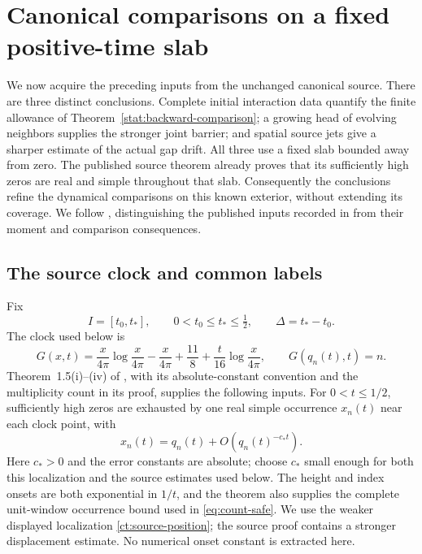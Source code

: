 \section{Canonical comparisons on a fixed positive-time slab}
\label{sec:canonicaltime}

We now acquire the preceding inputs from the unchanged canonical source.
There are three distinct conclusions. Complete initial interaction data
quantify the finite allowance of Theorem~\ref{stat:backward-comparison};
a growing head of evolving neighbors supplies the stronger joint barrier;
and spatial source jets give a sharper estimate of the actual gap drift.
All three use a fixed slab bounded away from zero. The published source
theorem already proves that its sufficiently high zeros are real and
simple throughout that slab. Consequently the conclusions refine the
dynamical comparisons on this known exterior, without extending its
coverage. We follow \cite{BakerCM21,BakerCM24,BakerCM25}, distinguishing
the published inputs recorded in \cite{BakerCMSource04} from their
moment and comparison consequences.

\subsection{The source clock and common labels}

Fix
\begin{equation}
 I=[t_0,t_*],\qquad 0<t_0\le t_*\le\tfrac12,
 \qquad \Delta=t_*-t_0.
 \label{ct:slab}
\end{equation}
The clock used below is
\begin{equation}
 G(x,t)=\frac{x}{4\pi}\log\frac{x}{4\pi}-\frac{x}{4\pi}
       +\frac{11}{8}+\frac{t}{16}\log\frac{x}{4\pi},
 \qquad G(q_n(t),t)=n.
 \label{ct:clock}
\end{equation}
Theorem~1.5(i)--(iv) of \cite{Polymath2019DBN}, with its absolute-constant
convention and the multiplicity count in its proof, supplies the following
inputs. For $0<t\le1/2$, sufficiently high zeros are exhausted by one
real simple occurrence $x_n(t)$ near each clock point, with
\begin{equation}
 x_n(t)=q_n(t)+O(q_n(t)^{-c_*t}).
 \label{ct:source-position}
\end{equation}
Here $c_*>0$ and the error constants are absolute; choose $c_*$ small
enough for both this localization and the source estimates used below.
The height and index
onsets are both exponential in $1/t$, and the theorem also supplies
the complete unit-window occurrence bound used in
\eqref{eq:count-safe}. We use the weaker displayed localization
\eqref{ct:source-position}; the source proof contains a stronger
displacement estimate. No numerical onset constant is extracted here.


